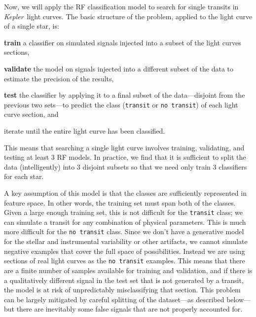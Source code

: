 \documentclass[12pt,preprint]{aastex}
\newcommand{\project}[1]{\textsl{#1}}
\newcommand{\kepler}{\project{Kepler}}
\begin{document}
Now, we will apply the RF classification model to search for single transits
in \kepler\ light curves.
The basic structure of the problem, applied to the light curve of a single
star, is:
\begin{enumerate}

{\item {\bf train} a classifier on simulated signals injected into a subset of
the light curves sections,}

{\item {\bf validate} the model on signals injected into a different subset of
the data to estimate the precision of the results,}

{\item {\bf test} the classifier by applying it to a final subset of the
data---disjoint from the previous two sets---to predict the class
(\texttt{transit} or \texttt{no transit}) of each light curve section, and}

{\item iterate until the entire light curve has been classified.}

\end{enumerate}
This means that searching a single light curve involves training, validating,
and testing at least 3 RF models.
In practice, we find that it is sufficient to split the data (intelligently)
into 3 disjoint subsets so that we need only train 3 classifiers for each
star.

A key assumption of this model is that the classes are sufficiently
represented in feature space.
In other words, the training set must span both of the classes.
Given a large enough training set, this is not difficult for the
\texttt{transit} class; we can simulate a transit for any combination of
physical parameters.
This is much more difficult for the \texttt{no transit} class.
Since we don't have a generative model for the stellar and instrumental
variability or other artifacts, we cannot simulate negative examples that
cover the full space of possibilities.
Instead we are using sections of real light curves as the \texttt{no transit}
examples.
This means that there are a finite number of samples available for training
and validation, and if there is a qualitatively different signal in the test
set that is not generated by a transit, the model is at risk of unpredictably
misclassifying that section.
This problem can be largely mitigated by careful splitting of the dataset---as
described below---but there are inevitably some false signals that are not
properly accounted for.
\end{document}
